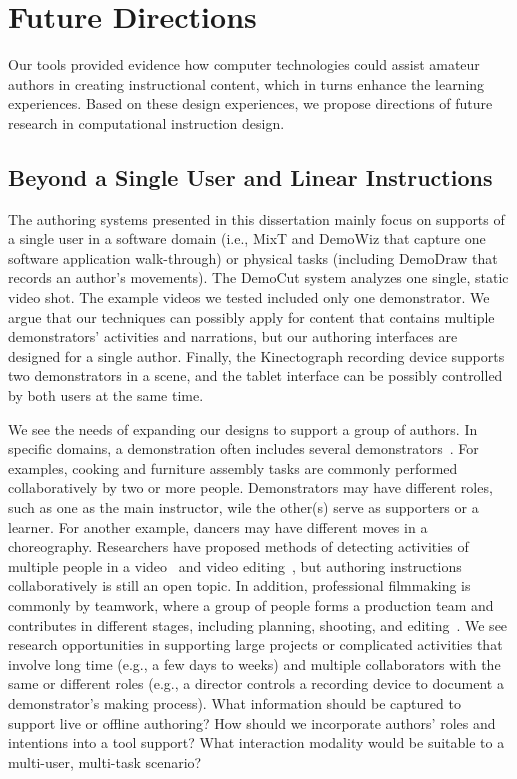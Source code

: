 \section{Future Directions} %

Our tools provided evidence how computer technologies could assist amateur authors in creating instructional content, which in turns enhance the learning experiences. Based on these design experiences, we propose directions of future research in computational instruction design.

\subsection{Beyond a Single User and Linear Instructions}
The authoring systems presented in this dissertation mainly focus on supports of a single user in a software domain (i.e., MixT and DemoWiz that capture one software application walk-through) or physical tasks (including DemoDraw that records an author's movements).
%
The DemoCut system analyzes one single, static video shot. The example videos we tested included only one demonstrator. We argue that our techniques can possibly apply for content that contains multiple demonstrators' activities and narrations, but our authoring interfaces are designed for a single author.
%
Finally, the Kinectograph recording device supports two demonstrators in a scene, and the tablet interface can be possibly controlled by both users at the same time.

We see the needs of expanding our designs to support a group of authors. In specific domains, a demonstration often includes several demonstrators~. For examples, cooking and furniture assembly tasks are commonly performed collaboratively by two or more people. Demonstrators may have different roles, such as one as the main instructor, wile the other(s) serve as supporters or a learner. For another example, dancers may have different moves in a choreography.
%
Researchers have proposed methods of detecting activities of multiple people in a video~ and video editing~\cite{PatelUIST16}, but authoring instructions collaboratively is still an open topic.
%
In addition, professional filmmaking is commonly by teamwork, where a group of people forms a production team and contributes in different stages, including planning, shooting, and editing~. We see research opportunities in supporting large projects or complicated activities that involve long time (e.g., a few days to weeks) and multiple collaborators with the same or different roles (e.g., a director controls a recording device to document a demonstrator's making process).
What information should be captured to support live or offline authoring? How should we incorporate authors' roles and intentions into a tool support? What interaction modality would be suitable to a multi-user, multi-task scenario?

